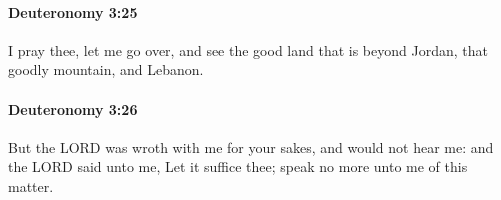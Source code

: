 		\paragraph{Deuteronomy 3:25} %
			\label{DEUTERONOMY-3-25}

			I pray thee, let me go over, and see the good land that is beyond Jordan, that goodly mountain, and Lebanon.


		\paragraph{Deuteronomy 3:26} %
			\label{DEUTERONOMY-3-26}

			But the LORD was wroth with me for your sakes, and would not hear me: and the LORD said unto me, Let it suffice thee; speak no more unto me of this matter.


